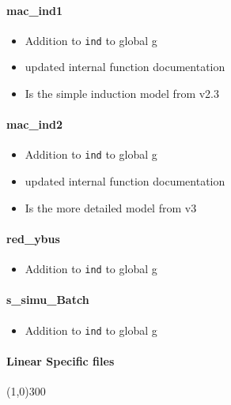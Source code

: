 \documentclass[12pt]{article}
\begin{document}
\paragraph{mac\_ind1}
	\begin{itemize}
		\item Addition to \verb|ind| to global g
		\item updated internal function documentation
		\item Is the simple induction model from v2.3
	\end{itemize}

\paragraph{mac\_ind2}
	\begin{itemize}
		\item Addition to \verb|ind| to global g
		\item updated internal function documentation
		\item Is the more detailed model from v3
	\end{itemize}

\paragraph{red\_ybus}
	\begin{itemize}
		\item Addition to \verb|ind| to global g
	\end{itemize}


\paragraph{s\_simu\_Batch}
	\begin{itemize}
		\item Addition to \verb|ind| to global g
	\end{itemize}


\paragraph{Linear Specific files}\line(1,0){300}
\end{document}
